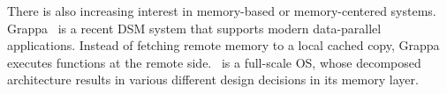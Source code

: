 \documentclass[10pt,times,twocolumn]{z2-article}
\begin{document}
{{{{{{{%


There is also increasing interest in memory-based or memory-centered systems.
Grappa~\cite{Nelson15-ATC} is a recent DSM system that supports 
modern data-parallel applications.
Instead of fetching remote memory to a local cached copy,
Grappa executes functions at the remote side.
\lego\ is a full-scale OS, whose decomposed architecture results in various different design decisions in its memory layer. 
\fi
}}}}}}}
\end{document}
